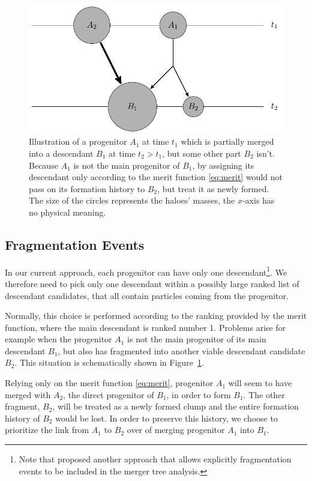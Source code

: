 \begin{figure}
  \centering
  \includegraphics[width=.9\linewidth]{./images/tikz/fracture.pdf}
  \caption{Illustration of a progenitor $A_1$ at time $t_1$ which is
    partially merged into a descendant $B_1$ at time $t_2 > t_1$, but
    some other part $B_2$ isn't.  Because $A_1$ is not the main
    progenitor of $B_1$, by assigning its descendant only according to
    the merit function \eqref{eq:merit} would not pass on its
    formation history to $B_2$, but treat it as newly formed.  The
    size of the circles represents the haloes' masses, the $x$-axis
    has no physical meaning.  }
  \label{fig:fracture}
\end{figure}

\subsection{Fragmentation Events}
\label{sect:frag}

In our current approach, each progenitor can have only one
descendant\footnote{Note that \cite{springelSimulatingCosmicStructure2021a}
proposed another approach that allows explicitly fragmentation
events to be included in the merger tree analysis.}. We therefore need
to pick only one descendant within a possibly large ranked list of
descendant candidates, that all contain particles coming from the
progenitor.

Normally, this choice is performed according to the ranking provided
by the merit function, where the main descendant is ranked number 1.
Problems arise for example when the progenitor $A_1$ is not the main
progenitor of its main descendant $B_1$, but also has fragmented into
another viable descendant candidate $B_2$.  This situation is
schematically shown in Figure~\ref{fig:fracture}.

Relying only on the merit function \eqref{eq:merit}, progenitor $A_1$
will seem to have merged with $A_2$, the direct progenitor of $B_1$,
in order to form $B_1$.  The other fragment, $B_2$, will be treated as
a newly formed clump and the entire formation history of $B_2$ would
be lost. In order to preserve this history, we choose to prioritize the 
link from $A_1$ to $B_2$ over of merging progenitor $A_1$ into $B_1$.


